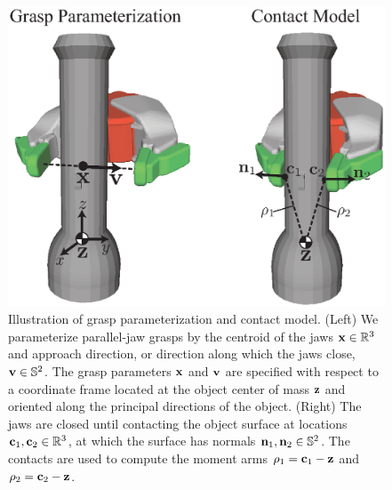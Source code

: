 \begin{figure}[t!]
\centering
\includegraphics[scale=0.4]{figures/illustrations/dexnet_grasping_model.eps}
\caption{Illustration of grasp parameterization and contact model. (Left) We parameterize parallel-jaw grasps by the centroid of the jaws $\mathbf{x} \in \mathbb{R}^3$ and approach direction, or direction along which the jaws close, $\mathbf{v} \in \mathbb{S}^2$. The grasp parameters $\mathbf{x}$ and $\mathbf{v}$ are specified with respect to a coordinate frame located at the object center of mass $\mathbf{z}$ and oriented along the principal directions of the object. (Right) The jaws are closed until contacting the object surface at locations $\mathbf{c}_1, \mathbf{c}_2 \in \mathbb{R}^3$, at which the surface has normals $\mathbf{n}_1, \mathbf{n}_2 \in \mathbb{S}^2$. The contacts are used to compute the moment arms $\rho_1 = \mathbf{c}_1 - \mathbf{z}$ and $\rho_2  = \mathbf{c}_2 - \mathbf{z}$.}
\vspace*{-15pt}
\end{figure}

